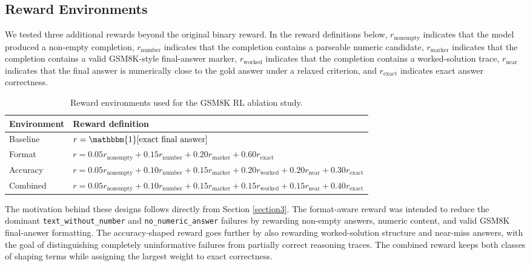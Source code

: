\documentclass[a4paper,12pt]{article}
\begin{document}
\subsection{Reward Environments}

We tested three additional rewards beyond the original binary reward. In the reward definitions below, $r_{\text{nonempty}}$ indicates that the model produced a non-empty completion, $r_{\text{number}}$ indicates that the completion contains a parseable numeric candidate, $r_{\text{marker}}$ indicates that the completion contains a valid GSM8K-style final-answer marker, $r_{\text{worked}}$ indicates that the completion contains a worked-solution trace, $r_{\text{near}}$ indicates that the final answer is numerically close to the gold answer under a relaxed criterion, and $r_{\text{exact}}$ indicates exact answer correctness.

\begin{table}[ht]
\centering
\footnotesize
\begin{tabular}{p{} p{}}
\hline
\textbf{Environment} & \textbf{Reward definition} \\
\hline
Baseline & $r = \mathbbm{1}[\text{exact final answer}]$ \\
Format & $r = 0.05 r_{\text{nonempty}} + 0.15 r_{\text{number}} + 0.20 r_{\text{marker}} + 0.60 r_{\text{exact}}$ \\
Accuracy & $r = 0.05 r_{\text{nonempty}} + 0.10 r_{\text{number}} + 0.15 r_{\text{marker}} + 0.20 r_{\text{worked}} + 0.20 r_{\text{near}} + 0.30 r_{\text{exact}}$ \\
Combined & $r = 0.05 r_{\text{nonempty}} + 0.10 r_{\text{number}} + 0.15 r_{\text{marker}} + 0.15 r_{\text{worked}} + 0.15 r_{\text{near}} + 0.40 r_{\text{exact}}$ \\
\hline
\end{tabular}
\caption{Reward environments used for the GSM8K RL ablation study.}
\label{tab:reward-systems}
\end{table}

The motivation behind these designs follows directly from Section \ref{section3}. The format-aware reward was intended to reduce the dominant \texttt{text\_without\_number} and \texttt{no\_numeric\_answer} failures by rewarding non-empty answers, numeric content, and valid GSM8K final-answer formatting. The accuracy-shaped reward goes further by also rewarding worked-solution structure and near-miss answers, with the goal of distinguishing completely uninformative failures from partially correct reasoning traces. The combined reward keeps both classes of shaping terms while assigning the largest weight to exact correctness.
\end{document}
